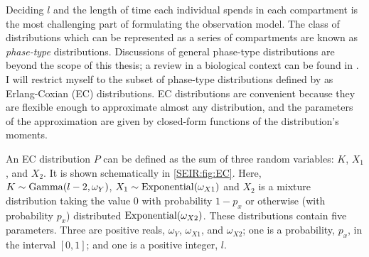 \documentclass[thesis.tex]{subfiles}
\begin{document}
Deciding $l$ and the length of time each individual spends in each compartment is the most challenging part of formulating the observation model.
The class of distributions which can be represented as a series of compartments are known as \emph{phase-type} distributions.
Discussions of general phase-type distributions are beyond the scope of this thesis; a review in a biological context can be found in \textcite{hobolthPhasetype}.
I will restrict myself to the subset of phase-type distributions defined by \textcite{osogamiClosed} as Erlang-Coxian (EC) distributions.
EC distributions are convenient because they are flexible enough to approximate almost any distribution, and the parameters of the approximation are given by closed-form functions of the distribution's moments.


An EC distribution $P$ can be defined as the sum of three random variables: $K$, $X_1$, and $X_2$.
It is shown schematically in \cref{SEIR:fig:EC}.
Here, $K \sim \operatorname{Gamma}(l-2, \omega_Y)$, $X_1 \sim \operatorname{Exponential}(\omega_{X1})$ and $X_2$ is a mixture distribution taking the value 0 with probability $1-p_x$ or otherwise (\ie with probability $p_x$) distributed $\operatorname{Exponential}(\omega_{X2})$.
These distributions contain five parameters.
Three are positive reals, $\omega_Y$, $\omega_{X1}$, and $\omega_{X2}$; one is a probability, $p_x$, in the interval $[0, 1]$; and one is a positive integer, $l$.
\end{document}
